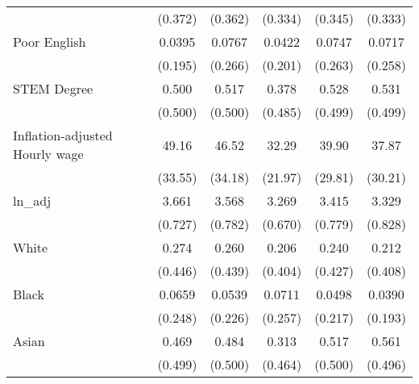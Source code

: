 \begin{table}[htbp]
\begin{tabular}{l*{5}{c}}
                    &     (0.372)         &     (0.362)         &     (0.334)         &     (0.345)         &     (0.333)         \\
[1em]
Poor English        &      0.0395         &      0.0767         &      0.0422         &      0.0747         &      0.0717         \\
                    &     (0.195)         &     (0.266)         &     (0.201)         &     (0.263)         &     (0.258)         \\
[1em]
STEM Degree         &       0.500         &       0.517         &       0.378         &       0.528         &       0.531         \\
                    &     (0.500)         &     (0.500)         &     (0.485)         &     (0.499)         &     (0.499)         \\
[1em]
Inflation-adjusted Hourly wage&       49.16         &       46.52         &       32.29         &       39.90         &       37.87         \\
                    &     (33.55)         &     (34.18)         &     (21.97)         &     (29.81)         &     (30.21)         \\
[1em]
ln\_adj              &       3.661         &       3.568         &       3.269         &       3.415         &       3.329         \\
                    &     (0.727)         &     (0.782)         &     (0.670)         &     (0.779)         &     (0.828)         \\
[1em]
White               &       0.274         &       0.260         &       0.206         &       0.240         &       0.212         \\
                    &     (0.446)         &     (0.439)         &     (0.404)         &     (0.427)         &     (0.408)         \\
[1em]
Black               &      0.0659         &      0.0539         &      0.0711         &      0.0498         &      0.0390         \\
                    &     (0.248)         &     (0.226)         &     (0.257)         &     (0.217)         &     (0.193)         \\
[1em]
Asian               &       0.469         &       0.484         &       0.313         &       0.517         &       0.561         \\
                    &     (0.499)         &     (0.500)         &     (0.464)         &     (0.500)         &     (0.496)         \\

\end{tabular}
\end{table}

